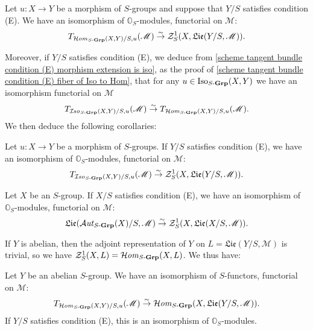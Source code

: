 \begin{proposition}\label{scheme group condition (E) tangent space of morphism module isomorphism}
Let $u:X\to Y$ be a morphism of $S$-groups and suppose that $Y/S$ satisfies condition (E). We have an isomorphism of $\mathbb{O}_S$-modules, functorial on $\mathscr{M}$:
\[T_{\operatorname{\mathcal{H}\hspace*{-0.4pt}\textit{om}\hspace{0.5pt}}_{S\textup{-}\mathbf{Grp}}(X,Y)/S,u}(\mathscr{M})\stackrel{\sim}{\to}\mathcal{Z}_S^1(X,\mathfrak{Lie}(Y/S,\mathscr{M})).\]
\end{proposition}

Moreover, if $Y/S$ satisfies condition (E), we deduce from \cref{scheme tangent bundle condition (E) morphism extension is iso}, as the proof of \cref{scheme tangent bundle condition (E) fiber of Iso to Hom}, that for any $u\in\mathrm{Iso}_{S\textup{-}\mathbf{Grp}}(X,Y)$ we have an isomorphism functorial on $\mathscr{M}$
\[T_{\operatorname{\mathcal{I}\hspace*{-0.5pt}\textit{so}\hspace{0.5pt}}_{S\textup{-}\mathbf{Grp}}(X,Y)/S,u}(\mathscr{M})\stackrel{\sim}{\to } T_{\operatorname{\mathcal{H}\hspace*{-0.4pt}\textit{om}\hspace{0.5pt}}_{S\textup{-}\mathbf{Grp}}(X,Y)/S,u}(\mathscr{M}).\]
We then deduce the following corollaries:

\begin{corollary}\label{scheme group condition (E) tangent space of sIso isomorphism}
Let $u:X\to Y$ be a morphism of $S$-groups. If $Y/S$ satisfies condition (E), we have an isomorphism of $\mathbb{O}_S$-modules, functorial on $\mathscr{M}$:
\[T_{\operatorname{\mathcal{I}\hspace*{-0.5pt}\textit{so}\hspace{0.5pt}}_{S\textup{-}\mathbf{Grp}}(X,Y)/S,u}(\mathscr{M})\stackrel{\sim}{\to}\mathcal{Z}_S^1(X,\mathfrak{Lie}(Y/S,\mathscr{M})).\]
\end{corollary}
\begin{corollary}\label{scheme group condition (E) tangent space of sAut isomorphism}
Let $X$ be an $S$-group. If $X/S$ satisfies condition (E), we have an isomorphism of $\mathbb{O}_S$-modules, functorial on $\mathscr{M}$:
\[\mathfrak{Lie}(\operatorname{\mathcal{A}\hspace*{-0.2pt}\textit{ut}\hspace{0.5pt}}_{S\textup{-}\mathbf{Grp}}(X)/S,\mathscr{M})\stackrel{\sim}{\to} \mathcal{Z}_S^1(X,\mathfrak{Lie}(X/S,\mathscr{M})).\]
\end{corollary}

If $Y$ is abelian, then the adjoint representation of $Y$ on $L=\mathfrak{Lie}(Y/S,\mathscr{M})$ is trivial, so we have $\mathcal{Z}_S^1(X,L)=\operatorname{\mathcal{H}\hspace*{-0.4pt}\textit{om}\hspace{0.5pt}}_{S\textup{-}\mathbf{Grp}}(X,L)$. We thus have:
\begin{corollary}\label{scheme group abelian tangent space of sHom isomorphism}
Let $Y$ be an abelian $S$-group. We have an isomorphism of $S$-functors, functorial on $\mathscr{M}$:
\[T_{\operatorname{\mathcal{H}\hspace*{-0.4pt}\textit{om}\hspace{0.5pt}}_{S\textup{-}\mathbf{Grp}}(X,Y)/S,u}(\mathscr{M})\stackrel{\sim}{\to}\operatorname{\mathcal{H}\hspace*{-0.4pt}\textit{om}\hspace{0.5pt}}_{S\textup{-}\mathbf{Grp}}(X,\mathfrak{Lie}(Y/S,\mathscr{M})).\]
If $Y/S$ satisfies condition (E), this is an isomorphism of $\mathbb{O}_S$-modules.
\end{corollary}


